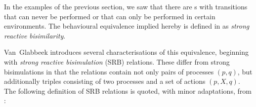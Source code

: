 %
\begin{isabellebody}%
%
%
\isadelimtheory
%
\endisadelimtheory
%
\isatagtheory
%
\endisatagtheory
{\isafoldtheory}%
%
\isadelimtheory
%
\endisadelimtheory
%
\isadelimdocument
%
\endisadelimdocument
%
\isatagdocument
%
\isamarkuptrue%
%
\endisatagdocument
{\isafolddocument}%
%
\isadelimdocument
%
\endisadelimdocument
%
\begin{isamarkuptext}%
\label{sec:reactive_bisimilarity}%
\end{isamarkuptext}\isamarkuptrue%
%
\begin{isamarkuptext}%
In the examples of the previous section, we saw that there are \LTSt{}s with transitions that can never be performed or that can only be performed in certain environments. The behavioural equivalence implied hereby is defined in \cite{rbs} as \emph{strong reactive bisimilarity}.

%
\end{isamarkuptext}\isamarkuptrue%
%
\isadelimdocument
%
\endisadelimdocument
%
\isatagdocument
%
\isamarkuptrue%
%
\endisatagdocument
{\isafolddocument}%
%
\isadelimdocument
%
\endisadelimdocument
%
\begin{isamarkuptext}%
Van~Glabbeek introduces several characterisations of this equivalence, beginning with \emph{strong reactive bisimulation} (SRB) relations. These differ from strong bisimulations in that the relations contain not only pairs of processes $(p,q)$, but additionally triples consisting of two processes and a set of actions $(p,X,q)$. The following definition of SRB relations is quoted, with minor adaptations, from \cite[Definition 1]{rbs}:


\end{isamarkuptext}
\end{isabellebody}
